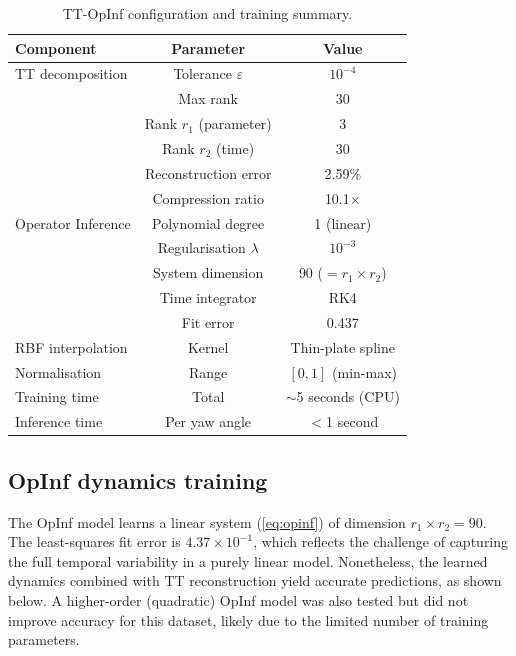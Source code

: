 \documentclass[12pt]{article}
\begin{document}
\begin{table}[t]
\centering
\caption{TT-OpInf configuration and training summary.}
\label{tab:tt_config}
\begin{tabular}{lcc}
\toprule
\textbf{Component} & \textbf{Parameter} & \textbf{Value} \\
\midrule
TT decomposition & Tolerance $\varepsilon$ & $10^{-4}$ \\
                 & Max rank & 30 \\
                 & Rank $r_1$ (parameter) & 3 \\
                 & Rank $r_2$ (time) & 30 \\
                 & Reconstruction error & 2.59\% \\
                 & Compression ratio & 10.1$\times$ \\
\midrule
Operator Inference & Polynomial degree & 1 (linear) \\
                   & Regularisation $\lambda$ & $10^{-3}$ \\
                   & System dimension & 90 ($= r_1 \times r_2$) \\
                   & Time integrator & RK4 \\
                   & Fit error & 0.437 \\
\midrule
RBF interpolation & Kernel & Thin-plate spline \\
\midrule
Normalisation & Range & $[0, 1]$ (min-max) \\
\midrule
Training time & Total & $\sim$5 seconds (CPU) \\
Inference time & Per yaw angle & $<$1 second \\
\bottomrule
\end{tabular}
\end{table}

\subsection{OpInf dynamics training}

The OpInf model learns a linear system (\cref{eq:opinf}) of dimension $r_1 \times r_2 = 90$.
The least-squares fit error is $4.37 \times 10^{-1}$, which reflects the challenge of capturing the full temporal variability in a purely linear model.
Nonetheless, the learned dynamics combined with TT reconstruction yield accurate predictions, as shown below.
A higher-order (quadratic) OpInf model was also tested but did not improve accuracy for this dataset, likely due to the limited number of training parameters.
\end{document}
